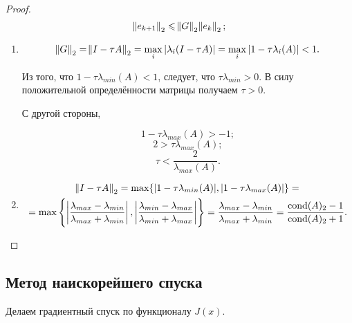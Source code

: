 \begin{proof}
    \[
        \norm{e_{k + 1}}_2 \leqslant \norm{G}_2 \norm{e_k}_2;
    \]
    \begin{enumerate}
        \item
            \[
                \norm{G}_2 = \norm{I - \tau A}_2
                = \max_i |\lambda_i (I - \tau A)|
                = \max_i |1 - \tau \lambda_i (A)| < 1.
            \]

            Из того, что $1 - \tau \lambda_{min}(A) < 1$, следует, что
            $\tau \lambda_{min} > 0$. В силу положительной определённости
            матрицы получаем $\tau > 0$.

            С другой стороны,

            \[
                1 - \tau \lambda_{max}(A) > -1;
            \]
            \[
                2 > \tau \lambda_{max}(A);
            \]
            \[
                \tau < \frac{2}{\lambda_{max}(A)}.
            \]
        \item
            \begin{multline*}
                \norm{I - \tau A}_2 = \max \{
                    |1 - \tau \lambda_{min}(A)|,
                    |1 - \tau \lambda_{max}(A)|
                \} =\\= \max \left\{
                    \left|\frac{\lambda_{max} - \lambda_{min}}
                          {\lambda_{max} + \lambda_{min}}\right|,
                    \left|\frac{\lambda_{min} - \lambda_{max}}
                          {\lambda_{min} + \lambda_{max}}\right|
                \right\}
                = \frac{\lambda_{max} - \lambda_{min}}
                       {\lambda_{max} + \lambda_{min}}
                = \frac{\operatorname{cond}(A)_2 - 1}{\operatorname{cond}(A)_2 + 1}.
            \end{multline*}
    \end{enumerate}
\end{proof}

\subsection{Метод наискорейшего спуска}

Делаем градиентный спуск по функционалу $J(x)$.

